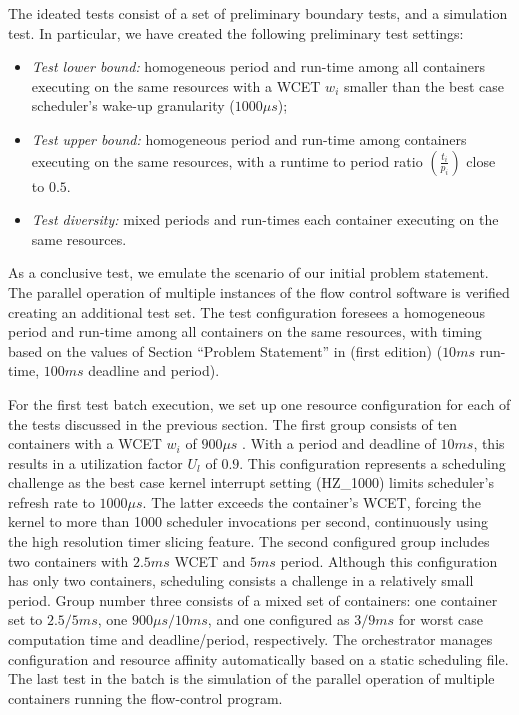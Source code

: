 \documentclass[]{scrartcl}
\begin{document}
The ideated tests consist of a set of preliminary boundary tests, and a simulation test.
In particular, we have created the following preliminary test settings:
\begin{itemize}
	\item \textit{Test lower bound:} homogeneous period and run-time among all containers executing on the same resources with a WCET $w_i$ smaller than the best case scheduler's wake-up granularity ($1000\mu s$);
	\item \textit{Test upper bound:} homogeneous period and run-time among containers executing on the same resources, with a runtime to period ratio $(\frac{t_i}{p_i})$ close to $0.5$.
	\item \textit{Test diversity:} mixed periods and run-times each container executing on the same resources.
\end{itemize}
As a conclusive test, we emulate the scenario of our initial problem statement. 
The parallel operation of multiple instances of the flow control software is verified creating an additional test set.
The test configuration foresees a homogeneous period and run-time among all containers on the same resources, with timing based on the values of Section ``Problem Statement'' in \cite{Hoferetal2019}(first edition) ($10ms$ run-time, $100ms$ deadline and period).

For the first test batch execution, we set up one resource configuration for each of the tests discussed in the previous section.
The first group consists of ten containers with a WCET $w_i$ of $900\mu s$ . 
With a period and deadline of $10ms$, this results in a utilization factor $U_l$ of $0.9$.
This configuration represents a scheduling challenge as the best case kernel interrupt setting (HZ\_1000) limits scheduler's refresh rate to $1000\mu s$. 
The latter exceeds the container's WCET, forcing the kernel to more than 1000 scheduler invocations per second, continuously using the high resolution timer slicing feature.
The second configured group includes two containers with %
$2.5ms$ WCET and $5ms$ period.
Although this configuration has only two containers, scheduling consists a challenge in a relatively small period.
Group number three consists of a mixed set of containers: one container set to $2.5/5ms$, one $900\mu s/10ms$, and one configured as $3/9ms$ for worst case computation time and deadline/period, respectively.
The orchestrator manages configuration and resource affinity automatically based on a static scheduling file.
The last test in the batch is the simulation of the parallel operation of multiple containers running the flow-control program. 
\end{document}
